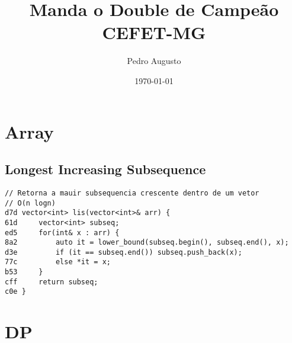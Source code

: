\documentclass[11pt, a4paper, twoside]{article}
\title{Manda o Double de Campeão \\ CEFET-MG}
\author{Pedro Augusto}
\begin{document}
\twocolumn
\date{\today}
\maketitle


\renewcommand{\contentsname}{Índice} %
\tableofcontents


%
%

\section{Array}

\subsection{Longest Increasing Subsequence}
\begin{lstlisting}
// Retorna a mauir subsequencia crescente dentro de um vetor
// O(n logn)
d7d vector<int> lis(vector<int>& arr) {
61d     vector<int> subseq;
ed5     for(int& x : arr) {
8a2         auto it = lower_bound(subseq.begin(), subseq.end(), x);
d3e         if (it == subseq.end()) subseq.push_back(x);
77c         else *it = x;
b53     }
cff     return subseq;
c0e }
\end{lstlisting}



%
%

\section{DP}
\end{document}
